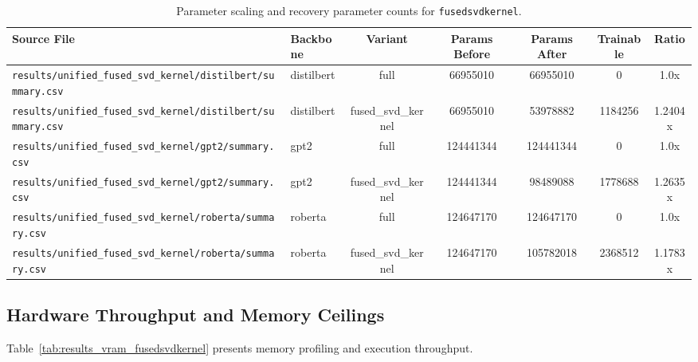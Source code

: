 \begin{table}[t]
\centering
\small
\begin{tabular}{llccccc}
\toprule
\textbf{Source File} & \textbf{Backbone} & \textbf{Variant} & \textbf{Params Before} & \textbf{Params After} & \textbf{Trainable} & \textbf{Ratio} \\
\midrule
\texttt{results/unified\_fused\_svd\_kernel/distilbert/summary.csv} & distilbert & full & 66955010 & 66955010 & 0 & 1.0x \\
\texttt{results/unified\_fused\_svd\_kernel/distilbert/summary.csv} & distilbert & fused\_svd\_kernel & 66955010 & 53978882 & 1184256 & 1.2404x \\
\texttt{results/unified\_fused\_svd\_kernel/gpt2/summary.csv} & gpt2 & full & 124441344 & 124441344 & 0 & 1.0x \\
\texttt{results/unified\_fused\_svd\_kernel/gpt2/summary.csv} & gpt2 & fused\_svd\_kernel & 124441344 & 98489088 & 1778688 & 1.2635x \\
\texttt{results/unified\_fused\_svd\_kernel/roberta/summary.csv} & roberta & full & 124647170 & 124647170 & 0 & 1.0x \\
\texttt{results/unified\_fused\_svd\_kernel/roberta/summary.csv} & roberta & fused\_svd\_kernel & 124647170 & 105782018 & 2368512 & 1.1783x \\
\bottomrule
\end{tabular}
\caption{Parameter scaling and recovery parameter counts for \texttt{fusedsvdkernel}.}
\label{tab:results_params_fusedsvdkernel}
\end{table}

\subsection{Hardware Throughput and Memory Ceilings}
Table~\ref{tab:results_vram_fusedsvdkernel} presents memory profiling and execution throughput.

